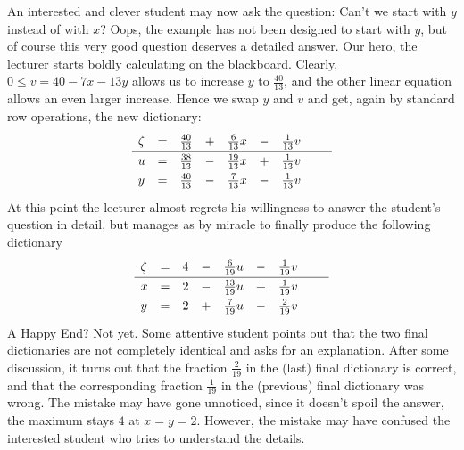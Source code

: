 \documentclass[ukenglish]{nik}
\begin{document}
An interested and clever student may now ask the question: 
Can't we start with $y$ instead of with $x$?
Oops, the example has not been designed to start with $y$, 
but of course this very good question deserves a detailed answer.
Our hero, the lecturer starts boldly calculating on the blackboard.
Clearly, $0\leq v = 40 - 7x -13y$ allows us to increase $y$ to $\frac{40}{13}$,
and the other linear equation allows an even larger increase. Hence we swap $y$ and $v$ and get,
again by standard row operations, the new dictionary:
\[    
    \begin{array}{lcrcrcrcr}
      \zeta&=& \frac{40}{13} &+& \frac{6}{13} x &-& \frac{1}{13} v &\vphantom{\frac{|}{|}} &  \\\hline
      u    &=& \frac{38}{13} &-&\frac{19}{13} x &+& \frac{1}{13} v &\vphantom{\frac{|}{|}} &  \\
      y    &=& \frac{40}{13} &-& \frac{7}{13} x &-& \frac{1}{13} v &\vphantom{\frac{|}{|}} &  \\
    \end{array}
\]
At this point the lecturer almost regrets his willingness to answer the student's
question in detail, but manages as by miracle to finally produce the following dictionary
\[    
    \begin{array}{lcrcrcrcr}
      \zeta&=& 4 &-& \frac{6}{19} u &-& \frac{1}{19} v &\vphantom{\frac{|}{|}} &  \\\hline
      x    &=& 2 &-&\frac{13}{19} u &+& \frac{1}{19} v &\vphantom{\frac{|}{|}} &  \\
      y    &=& 2 &+& \frac{7}{19} u &-& \frac{2}{19} v &\vphantom{\frac{|}{|}} &  \\
    \end{array}
\]
A Happy End? Not yet. Some attentive student points out that the two final dictionaries
are not completely identical and asks for an explanation. After some discussion, it turns
out that the fraction $\frac{2}{19}$ in the (last) final dictionary is correct,
and that the corresponding fraction $\frac{1}{19}$ in the (previous) final dictionary was wrong.
The mistake may have gone unnoticed, since it doesn't spoil the answer, the maximum stays
$4$ at $x=y=2$. However, the mistake may have confused the interested student who tries
to understand the details.
\end{document}
